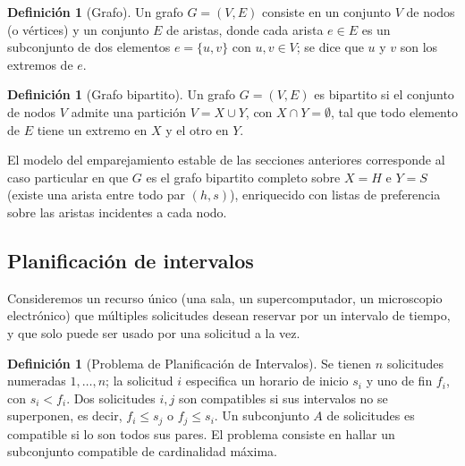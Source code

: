 \documentclass[12pt, spanish, oneside, openany]{book}
\theoremstyle{uprightplain}
\theoremstyle{definition}
\newtheorem{definicion}[teorema]{Definición}
\theoremstyle{remark}
\theoremstyle{definition}
\begin{document}
\begin{definicion}[Grafo]
\label{def:grafo-intro}
Un grafo $G=(V,E)$ consiste en un conjunto $V$ de nodos (o vértices) y un conjunto $E$ de aristas, donde cada arista $e \in E$ es un subconjunto de dos elementos $e=\{u,v\}$ con $u,v \in V$; se dice que $u$ y $v$ son los extremos de $e$.
\end{definicion}

\begin{definicion}[Grafo bipartito]
\label{def:grafo-bipartito}
Un grafo $G=(V,E)$ es bipartito si el conjunto de nodos $V$ admite una partición $V = X \cup Y$, con $X \cap Y = \emptyset$, tal que todo elemento de $E$ tiene un extremo en $X$ y el otro en $Y$.
\end{definicion}

El modelo del emparejamiento estable de las secciones anteriores corresponde al caso particular en que $G$ es el grafo bipartito completo sobre $X=H$ e $Y=S$ (existe una arista entre todo par $(h,s)$), enriquecido con listas de preferencia sobre las aristas incidentes a cada nodo.

\subsection{Planificación de intervalos}
\label{subsec:interval-scheduling}

Consideremos un recurso único (una sala, un supercomputador, un microscopio electrónico) que múltiples solicitudes desean reservar por un intervalo de tiempo, y que solo puede ser usado por una solicitud a la vez.

\begin{definicion}[Problema de Planificación de Intervalos]
\label{def:interval-scheduling}
Se tienen $n$ solicitudes numeradas $1,\dots,n$; la solicitud $i$ especifica un horario de inicio $s_i$ y uno de fin $f_i$, con $s_i < f_i$. Dos solicitudes $i,j$ son compatibles si sus intervalos no se superponen, es decir, $f_i \le s_j$ o $f_j \le s_i$. Un subconjunto $A$ de solicitudes es compatible si lo son todos sus pares. El problema consiste en hallar un subconjunto compatible de cardinalidad máxima.
\end{definicion}
\end{document}
